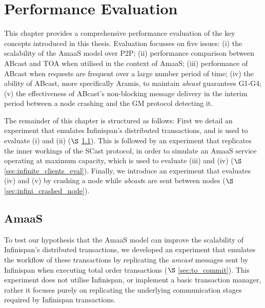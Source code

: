 \chapter{Performance Evaluation}\label{ch:perf_eval}
    \graphicspath{{Chapter6-PerformanceEvaluation/Figs/Vector/}{Chapter6-PerformanceEvaluation/Figs/}}
    
    This chapter provides a comprehensive performance evaluation of the key concepts introduced in this thesis.  Evaluation focusses on five issues: (i) the scalability of the \textsf{AmaaS} model over P2P; (ii) performance comparison between \textsf{ABcast} and TOA when utilised in the context of \textsf{AmaaS}; (iii) performance of \textsf{ABcast} when requests are frequent over a large number period of time; (iv) the ability of \textsf{ABcast}, more specifically \textsf{Aramis}, to maintain  \emph{abcast} guarantees G1-G4; (v)  the effectiveness of \textsf{ABcast}'s non-blocking message delivery in the interim period between a node crashing and the GM protocol detecting it.  
   
    The remainder of this chapter is structured as follows: First we detail an experiment that emulates Infinispan's distributed transactions, and is used to evaluate (i) and (ii) ($\S$ \ref{sec:emulated_transactions}).  This is followed by an experiment that replicates the inner workings of the \textsf{SCast} protocol, in order to simulate an \textsf{AmaaS} service operating at maximum capacity, which is used to evaluate (iii) and (iv) ($\S$ \ref{sec:infinite_clients_eval}).  Finally, we introduce an experiment that evaluates (iv) and (v) by crashing a node while \emph{abcast}s are sent between nodes ($\S$ \ref{sec:infini_crashed_node}).  


\section{AmaaS}\label{sec:emulated_transactions}
	To test our hypothesis that the \textsf{AmaaS} model can improve the scalability of Infinispan's distributed transactions, we developed an experiment that emulates the workflow of these transactions by replicating the \emph{amcast} messages sent by Infinispan when executing total order transactions ($\S$ \ref{sec:to_commit}).  This experiment does not utilise Infinispan, or implement a basic transaction manager, rather it focuses purely on replicating the underlying communication stages required by Infinispan transactions.  
	
